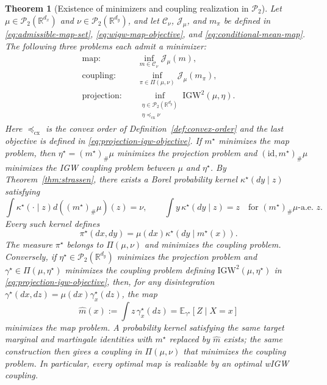 \documentclass[11pt]{article}
\newcommand{\R}{\mathbb R}
\newcommand{\E}{\mathbb E}
\newcommand{\cP}{\mathcal P}
\newcommand{\cx}{\preceq_{\mathrm{cx}}}
\newcommand{\IGW}{\mathrm{IGW}}
\theoremstyle{plain}
\newtheorem{theorem}{Theorem}[section]
\theoremstyle{definition}
\theoremstyle{remark}
\begin{document}
\begin{theorem}[Existence of minimizers and coupling realization in $\cP_2$]
\label{thm:existence}
Let $\mu\in\cP_2(\R^{d_x})$ and $\nu\in\cP_2(\R^{d_y})$, and let
$\mathcal C_\nu$, $\mathcal J_\mu$, and $m_\pi$ be defined in
\eqref{eq:admissible-map-set}, \eqref{eq:wigw-map-objective}, and
\eqref{eq:conditional-mean-map}. The following three problems each admit a
minimizer:
\[
\begin{aligned}
 \text{map:}\quad
 &\inf_{m\in\mathcal C_\nu}\mathcal J_\mu(m),\\
 \text{coupling:}\quad
 &\inf_{\pi\in\Pi(\mu,\nu)}\mathcal J_\mu(m_\pi),\\
 \text{projection:}\quad
 &\inf_{\substack{\eta\in\cP_2(\R^{d_y})\\ \eta\cx\nu}}
   \IGW^2(\mu,\eta).
\end{aligned}
\]
Here $\cx$ is the convex order of
Definition~\ref{def:convex-order} and the last objective is defined in
\eqref{eq:projection-igw-objective}. If $m^\star$ minimizes the map problem, then
$\eta^\star=(m^\star)_\#\mu$ minimizes the projection problem and
$(\mathrm{id},m^\star)_\#\mu$ minimizes the IGW coupling problem between $\mu$
and $\eta^\star$. By Theorem~\ref{thm:strassen}, there exists a Borel probability
kernel \(\kappa^\star(dy\mid z)\) satisfying
\[
 \int\kappa^\star(\mathord\cdot\mid z)d((m^\star)_\#\mu)(z)=\nu,
 \qquad
 \int y\,\kappa^\star(dy\mid z)=z
 \quad\text{for $(m^\star)_\#\mu$-a.e. }z.
\]
Every such kernel defines
\[
  \pi^\star(dx,dy)=\mu(dx)\kappa^\star(dy\mid m^\star(x)).
\]
The measure $\pi^\star$ belongs to $\Pi(\mu,\nu)$ and minimizes the coupling
problem.
Conversely, if \(\eta^\star\in\cP_2(\R^{d_y})\) minimizes the projection problem and
\(\gamma^\star\in\Pi(\mu,\eta^\star)\) minimizes the coupling problem defining
$\IGW^2(\mu,\eta^\star)$ in \eqref{eq:projection-igw-objective}, then, for any
disintegration $\gamma^\star(dx,dz)=\mu(dx)\gamma_x^\star(dz)$, the map
\[
  \widehat m(x):=\int z\,\gamma_x^\star(dz)
  =\E_{\gamma^\star}[Z\mid X=x]
\]
minimizes the map problem. A probability kernel satisfying the same target marginal
and martingale identities with $m^\star$ replaced by $\widehat m$ exists; the same
construction then gives a coupling in $\Pi(\mu,\nu)$ that minimizes the coupling
problem.
In particular, every optimal map is realizable by an optimal wIGW coupling.
\end{theorem}
\end{document}
